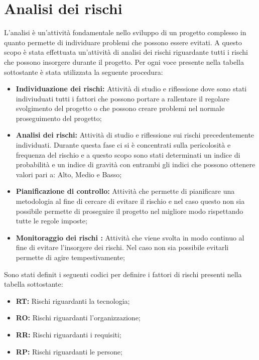 \section{Analisi dei rischi}
L'analisi è un'attività fondamentale nello sviluppo di un progetto complesso in quanto permette di individuare problemi che possono essere evitati.
A questo scopo è stata effettuata un'attività di analisi dei rischi riguardante tutti i rischi che possono insorgere durante il progetto.
Per ogni voce presente nella tabella sottostante è stata utilizzata la seguente procedura:
\begin{itemize}
	\item \textbf{Individuazione dei rischi:} Attività di studio e riflessione dove sono stati indiviuduati tutti i fattori che possono portare a rallentare il regolare svolgimento del progetto o che possono creare problemi nel normale proseguimento del progetto; \\
	\item \textbf{Analisi dei rischi:} Attività di studio e riflessione sui rischi precedentemente individuati. Durante questa fase ci si è concentrati sulla pericolosità e frequenza del rischio e a questo scopo sono stati determinati un indice di probabilità e un indice di gravità con entrambi gli indici che possono ottenere valori pari a: Alto, Medio e Basso; \\
	\item \textbf{Pianificazione di controllo:} Attività che permette di pianificare una metodologia al fine di cercare di evitare il rischio e nel caso questo non sia possibile permette di proseguire il progetto nel migliore modo rispettando tutte le regole imposte; \\
	\item \textbf{Monitoraggio dei rischi :} Attività che viene svolta in modo continuo al fine di evitare l'insorgere dei rischi. Nel caso non sia possibile evitarli permette di agire tempestivamente; \\
\end{itemize}
Sono stati definit i seguenti codici per definire i fattori di rischi presenti nella tabella sottostante:
\begin{itemize}
	\item \textbf{RT:} Rischi riguardanti la tecnologia;
	\item \textbf{RO:} Rischi riguardanti l'organizzazione;
	\item \textbf{RR:} Rischi riguardanti i requisiti;
	\item \textbf{RP:} Rischi riguardanti le persone;
	\\
	\\
	\\
	\\
	\\
	\\
	\\
	\\
	\\
	\\
\end{itemize}

